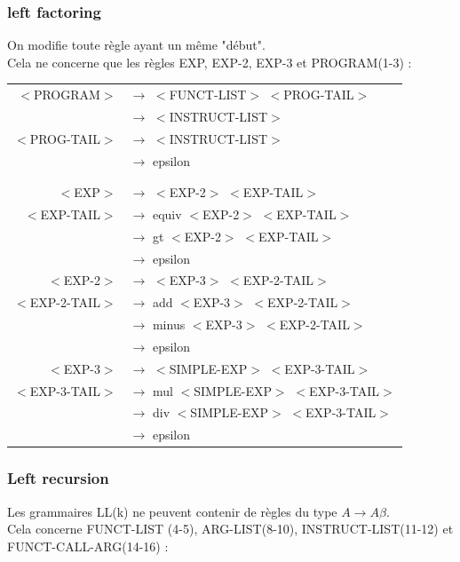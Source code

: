 \documentclass[a4paper,10pt]{article}
\begin{document}
\subsubsection{left factoring}
	On modifie toute règle ayant un même "début".\\
	Cela ne concerne que les règles EXP, EXP-2, EXP-3 et PROGRAM(1-3) : \\
	\begin{center}\begin{tabular}{rl}
		$<$PROGRAM$>$		& $\rightarrow$ $<$FUNCT-LIST$>$ $<$PROG-TAIL$>$\\
							& $\rightarrow$ $<$INSTRUCT-LIST$>$\\
		$<$PROG-TAIL$>$		& $\rightarrow$ $<$INSTRUCT-LIST$>$\\
							& $\rightarrow$ epsilon\\
							&\\
							&\\
		$<$EXP$>$			& $\rightarrow$ $<$EXP-2$>$ $<$EXP-TAIL$>$ \\

		$<$EXP-TAIL$>$		& $\rightarrow$ equiv $<$EXP-2$>$ $<$EXP-TAIL$>$\\
							& $\rightarrow$ gt $<$EXP-2$>$ $<$EXP-TAIL$>$\\ 
							& $\rightarrow$ epsilon \\
					
		$<$EXP-2$>$			& $\rightarrow$ $<$EXP-3$>$ $<$EXP-2-TAIL$>$ \\

		$<$EXP-2-TAIL$>$	& $\rightarrow$ add $<$EXP-3$>$ $<$EXP-2-TAIL$>$\\
							& $\rightarrow$ minus $<$EXP-3$>$ $<$EXP-2-TAIL$>$\\ 
							& $\rightarrow$ epsilon \\
					
		$<$EXP-3$>$			& $\rightarrow$ $<$SIMPLE-EXP$>$ $<$EXP-3-TAIL$>$ \\

		$<$EXP-3-TAIL$>$	& $\rightarrow$ mul $<$SIMPLE-EXP$>$ $<$EXP-3-TAIL$>$\\
							& $\rightarrow$ div $<$SIMPLE-EXP$>$ $<$EXP-3-TAIL$>$\\ 
							& $\rightarrow$ epsilon \\				
	\end{tabular}\end{center}

\subsubsection{Left recursion}
	Les grammaires LL(k) ne peuvent contenir de règles du type $A \rightarrow A \beta$.\\
	Cela concerne FUNCT-LIST (4-5), ARG-LIST(8-10), INSTRUCT-LIST(11-12) et FUNCT-CALL-ARG(14-16) : \\
\end{document}
